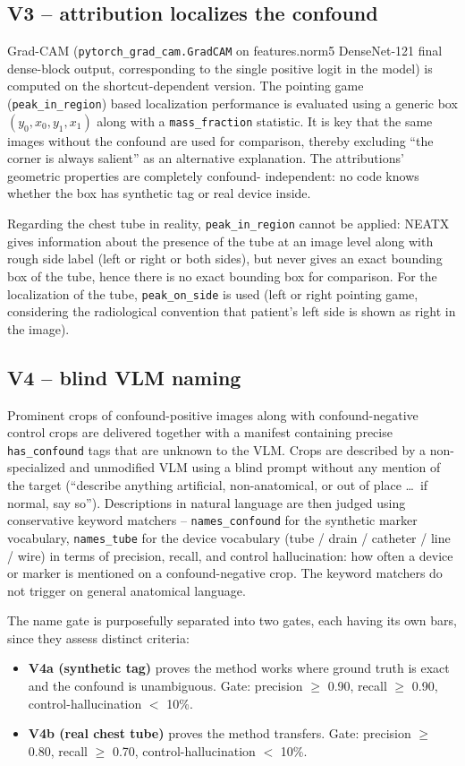 \documentclass{ieeeaccess}
\begin{document}
\subsection{V3 -- attribution localizes the confound}
Grad-CAM (\texttt{pytorch\_grad\_cam.GradCAM} on
features.norm5
DenseNet-121 final dense-block output, corresponding to the single positive
logit in the model) is computed on the shortcut-dependent version. The pointing
game (\texttt{peak\_in\_region}) based localization performance is evaluated
using a generic box $(y_0, x_0, y_1, x_1)$ along with a \texttt{mass\_fraction}
statistic. It is key that the same images without the confound are used for
comparison, thereby excluding ``the corner is always salient'' as an alternative
explanation. The attributions' geometric properties are completely confound-
independent: no code knows whether the box has synthetic tag or real device
inside.

Regarding the chest tube in reality, \texttt{peak\_in\_region} cannot be applied: NEATX gives information about the presence of the tube at an image level along with rough side label (left or right or both sides), but never gives an exact bounding box of the tube, hence there is no exact bounding box for comparison. For the localization of the tube, \texttt{peak\_on\_side} is used (left or right pointing game, considering the radiological convention that patient’s left side is shown as right in the image).

\subsection{V4 -- blind VLM naming}
Prominent crops of confound-positive images along with confound-negative
control crops are delivered together with a manifest containing precise \texttt{has\_confound}
tags that are unknown to the VLM. Crops are described by a non-specialized
and unmodified VLM using a blind prompt without any mention of the target
(``describe anything artificial, non-anatomical, or out of place \ldots\
if normal, say so''). Descriptions in natural language are then judged
using conservative keyword matchers -- \texttt{names\_confound} for the synthetic marker vocabulary,
\texttt{names\_tube} for the device vocabulary (tube / drain / catheter / line / wire)
 in terms of precision, recall, and control hallucination: how often a device
or marker is mentioned on a confound-negative crop. The keyword matchers do
not trigger on general anatomical language.

The name gate is purposefully separated into two gates, each having its own bars,
since they assess distinct criteria:
\begin{itemize}
\item \textbf{V4a (synthetic tag)} proves the method works where ground
truth is exact and the confound is unambiguous. Gate: precision $\geq$ 0.90,
recall $\geq$ 0.90, control-hallucination $<$ 10\%.
\item \textbf{V4b (real chest tube)} proves the method transfers. Gate:
precision $\geq$ 0.80, recall $\geq$ 0.70, control-hallucination $<$ 10\%.
\end{itemize}
\end{document}
